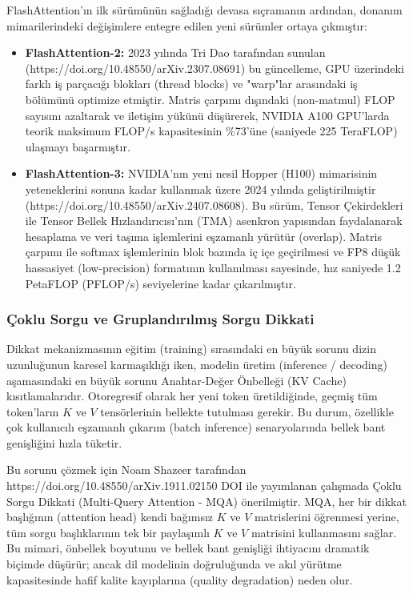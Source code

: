 \documentclass[11pt,a4paper]{article}
\begin{document}
FlashAttention'ın ilk sürümünün sağladığı devasa sıçramanın ardından, donanım mimarilerindeki değişimlere entegre edilen yeni sürümler ortaya çıkmıştır:

\begin{itemize}
  \item \textbf{FlashAttention-2:} 2023 yılında Tri Dao tarafından sunulan (https://doi.org/10.48550/arXiv.2307.08691) bu güncelleme, GPU üzerindeki farklı iş parçacığı blokları (thread blocks) ve "warp"lar arasındaki iş bölümünü optimize etmiştir. Matris çarpımı dışındaki (non-matmul) FLOP sayısını azaltarak ve iletişim yükünü düşürerek, NVIDIA A100 GPU'larda teorik maksimum FLOP/s kapasitesinin \%73'üne (saniyede 225 TeraFLOP) ulaşmayı başarmıştır.
  \item \textbf{FlashAttention-3:} NVIDIA'nın yeni nesil Hopper (H100) mimarisinin yeteneklerini sonuna kadar kullanmak üzere 2024 yılında geliştirilmiştir (https://doi.org/10.48550/arXiv.2407.08608). Bu sürüm, Tensor Çekirdekleri ile Tensor Bellek Hızlandırıcısı'nın (TMA) asenkron yapısından faydalanarak hesaplama ve veri taşıma işlemlerini eşzamanlı yürütür (overlap). Matris çarpımı ile softmax işlemlerinin blok bazında iç içe geçirilmesi ve FP8 düşük hassasiyet (low-precision) formatının kullanılması sayesinde, hız saniyede 1.2 PetaFLOP (PFLOP/s) seviyelerine kadar çıkarılmıştır.
\end{itemize}
\subsubsection{Çoklu Sorgu ve Gruplandırılmış Sorgu Dikkati}
Dikkat mekanizmasının eğitim (training) sırasındaki en büyük sorunu dizin uzunluğunun karesel karmaşıklığı iken, modelin üretim (inference / decoding) aşamasındaki en büyük sorunu Anahtar-Değer Önbelleği (KV Cache) kısıtlamalarıdır. Otoregresif olarak her yeni token üretildiğinde, geçmiş tüm token'ların \(K\) ve \(V\) tensörlerinin bellekte tutulması gerekir. Bu durum, özellikle çok kullanıcılı eşzamanlı çıkarım (batch inference) senaryolarında bellek bant genişliğini hızla tüketir.

Bu sorunu çözmek için Noam Shazeer tarafından https://doi.org/10.48550/arXiv.1911.02150 DOI ile yayımlanan çalışmada Çoklu Sorgu Dikkati (Multi-Query Attention - MQA) önerilmiştir. MQA, her bir dikkat başlığının (attention head) kendi bağımsız \(K\) ve \(V\) matrislerini öğrenmesi yerine, tüm sorgu başlıklarının tek bir paylaşımlı \(K\) ve \(V\) matrisini kullanmasını sağlar. Bu mimari, önbellek boyutunu ve bellek bant genişliği ihtiyacını dramatik biçimde düşürür; ancak dil modelinin doğruluğunda ve akıl yürütme kapasitesinde hafif kalite kayıplarına (quality degradation) neden olur.
\end{document}
